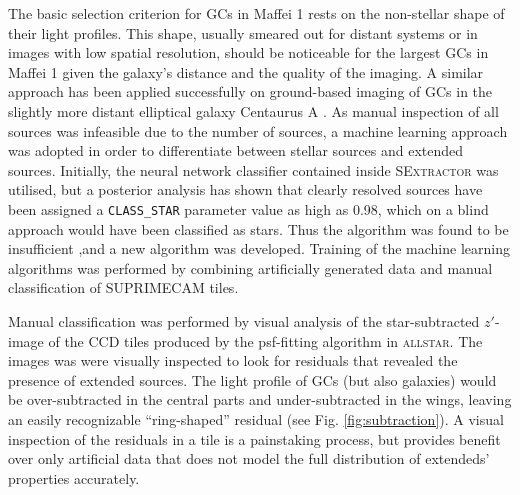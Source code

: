 \documentclass[useAMS,usenatbib]{mn2e}
\begin{document}
The basic selection criterion for GCs in Maffei 1 rests on the
non-stellar shape of their light profiles. This shape, usually smeared
out for distant systems or in images with low spatial resolution,
should be noticeable for the largest GCs in Maffei 1 given the
galaxy's distance and the quality of the imaging. A similar approach
has been applied successfully on ground-based imaging of GCs in the
slightly more distant elliptical galaxy Centaurus A
\citep{rejkuba01,gomez06,gomez07}. As manual inspection of all sources was infeasible
due to the number of sources, a machine learning approach was adopted in order
to differentiate between stellar sources and extended sources. Initially, the neural network
classifier contained inside \textsc{SExtractor} was utilised, but a posterior analysis has shown that clearly resolved sources have been assigned a \verb+CLASS_STAR+ parameter value as high
as 0.98, which on a blind approach would have been classified as
stars. Thus the algorithm was found to be insufficient ,and a new algorithm was developed. Training of the machine learning algorithms was performed by combining artificially generated data and manual classification of \textsc{SUPRIMECAM} tiles.

Manual classification was performed by visual analysis of the star-subtracted $z'$-image of the CCD tiles produced by the psf-fitting algorithm in
\textsc{allstar}. The images was were visually inspected to look for residuals that
revealed the presence of extended sources. The light profile of GCs
(but also galaxies) would be over-subtracted in the central parts and
under-subtracted in the wings, leaving an easily recognizable
``ring-shaped'' residual (see Fig. \ref{fig:subtraction}). A visual
inspection of the residuals in a tile is a
painstaking process, but provides benefit over only artificial data that does not model the full distribution of extendeds' properties accurately. 
\end{document}
